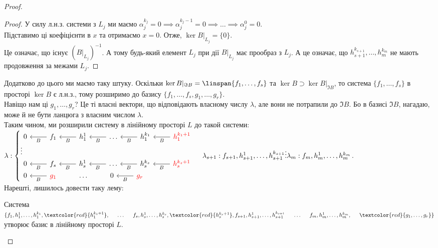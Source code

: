 \begin{proof}
\begin{proof}
У силу л.н.з. системи з $L_j$ ми маємо $\alpha_j^{k_j} = 0 \implies \alpha_j^{k_j-1} = 0 \implies \dots \implies \alpha_j^0 = 0$.\\
Підставимо ці коефіцієнти в $x$ та отримаємо $x = 0$. Отже, $\ker B|_{L_j} = \{0\}$.\\
Це означає, що існує $(B|_{L_j})^{-1}$. А тому будь-який елемент $L_j$ при дії $B|_{L_j}$ має прообраз з $L_j$. А це означає, що $h_{s+1}^{k_{s+1}},\dots,h_m^{k_m}$ не мають продовження за межами $L_{j}$.
\end{proof}

Додатково до цього ми маємо таку штуку. Оскільки $\ker B|_{\Im B} = \linspan \{f_1,\dots,f_s\}$ та $\ker B \supset \ker B|_{\Im B}$, то система $\{f_1,\dots,f_s\}$ в просторі $\ker B$ є л.н.з., тому розширимо до базису $\{f_1,\dots,f_s,g_1,\dots,g_r\}$.\\
Навіщо нам ці $g_1,\dots,g_r$? Це ті власні вектори, що відповідають власному числу $\lambda$, але вони не потрапили до $\Im B$. Бо в базисі $\Im B$, нагадаю, може й не бути ланцюга з власним числом $\lambda$.
\bigskip \\
Таким чином, ми розширили систему в лінійному просторі $L$ до такой системи:\\
$ \lambda: \begin{cases}
\begin{tikzcd}
0 & f_1 \arrow{l}{B} & h_1^1 \arrow{l}{B} & \dots \arrow{l}{B} & h_1^{k_1} \arrow{l}{B} & \textcolor{red}{h_1^{k_1+1}} \arrow{l}{B}
\end{tikzcd}\\
\vdots \\
\begin{tikzcd}
0 & f_s \arrow{l}{B} & h_s^1 \arrow{l}{B} & \dots \arrow{l}{B} & h_s^{k_s} \arrow{l}{B} & \textcolor{red}{h_s^{k_s+1}} \arrow{l}{B}
\end{tikzcd}\\
\begin{tikzcd}
0 & \textcolor{red}{g_1} \arrow{l}{B} & \dots & 0 & \textcolor{red}{g_r} \arrow{l}{B} &
\end{tikzcd}
\end{cases}
\\
\lambda_{s+1}: f_{s+1}, h_{s+1}^1,\dots,h_{s+1}^{k_{s+1}}\\
\vdots\\
\lambda_m: f_{m}, h_{m}^1,\dots,h_{m}^{k_{m}}
$.\\
Нарешті, лишилось довести таку лему:
\begin{lemma}
Система $\{f_1,h_1^1,\dots,h_1^{k_1},\textcolor{red}{h_1^{k_1+1}}, \hspace{0.5cm} \dots \hspace{0.5cm} f_s, h_s^{1}, \dots,h_s^{k_s}, \textcolor{red}{h_s^{k_s+1}}, \\ f_{s+1}, h_{s+1}^1, \dots, h_{s+1}^{k_{s+1}} \hspace{0.5cm} \dots \hspace{0.5cm} f_{m}, h_{m}^1, \dots, h_{m}^{k_m}, \hspace{0.5cm} \textcolor{red}{g_1, \dots, g_r}\}$ утворює базис в лінійному просторі $L$.
\end{lemma}


\end{proof}

